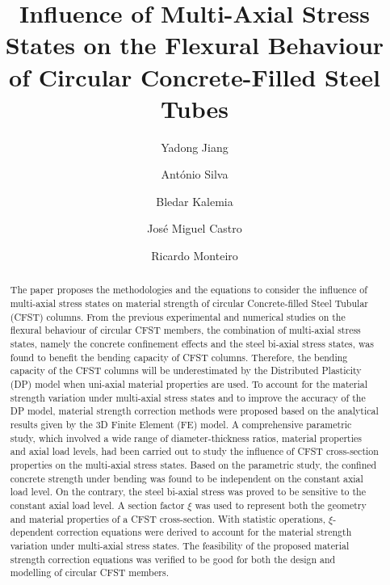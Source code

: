 \documentclass[12pt, A4]{article}
\title{Influence of Multi-Axial Stress States on the Flexural Behaviour of Circular Concrete-Filled Steel Tubes}
\author{Yadong Jiang \and António Silva \and Bledar Kalemia \and José Miguel Castro \and Ricardo Monteiro}
\date{}
\begin{document}
	\maketitle
	
	\begin{abstract}
		The paper proposes the methodologies and the equations to consider the influence of multi-axial stress states on material strength of circular Concrete-filled Steel Tubular (CFST) columns. From the previous experimental and numerical studies on the flexural behaviour of circular CFST members, the combination of multi-axial stress states, namely the concrete confinement effects and the steel bi-axial stress states, was found to benefit the bending capacity of CFST columns. Therefore, the bending capacity of the CFST columns will be underestimated by the Distributed Plasticity (DP) model when uni-axial material properties are used. To account for the material strength variation under multi-axial stress states and to improve the accuracy of the DP model, material strength correction methods were proposed based on the analytical results given by the 3D Finite Element (FE) model. A comprehensive parametric study, which involved a wide range of diameter-thickness ratios, material properties and axial load levels, had been carried out to study the influence of CFST cross-section properties on the multi-axial stress states. Based on the parametric study, the confined concrete strength under bending was found to be independent on the constant axial load level. On the contrary, the steel bi-axial stress was proved to be sensitive to the constant axial load level. A section factor $\xi$ was used to represent both the geometry and material properties of a CFST cross-section. With statistic operations, $\xi$-dependent correction equations were derived to account for the material strength variation under multi-axial stress states. The feasibility of the proposed material strength correction equations was verified to be good for both the design and modelling of circular CFST members.
	\end{abstract}
\end{document}
